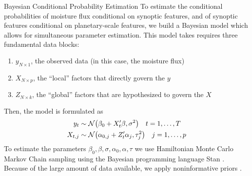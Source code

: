 \begin{block}{Bayesian Conditional Probability Estimation}
    To estimate the conditional probabilities of moisture flux conditional on synoptic features, and of synoptic features conditional on planetary-scale features, we build a Bayesian model which allows for simultaneous parameter estimation.
    This model takes requires three fundamental data blocks:
    \begin{enumerate}
        \item $y_{N \times 1}$, the observed data (in this case, the moisture flux)
        \item $X_{N \times p}$, the ``local'' factors that directly govern the $y$
        \item $Z_{N \times k}$, the ``global'' factors that are hypothesized to govern the $X$
    \end{enumerate}
    Then, the model is formulated as
    \begin{align}
        y_t & \sim \mathcal{N} \qty(\beta_0 + X'_t \beta, \sigma^2) \quad t = 1, \ldots, T \label{eq:yX}\\
        X_{t,j} &\sim \mathcal{N} \qty(\alpha_{0,j} + Z'_t \alpha_j, \tau_j^2) \quad j = 1, \ldots, p \label{eq:XZ}
    \end{align}
    To estimate the parameters $\beta_0, \beta, \sigma, \alpha_0, \alpha, \tau$ we use Hamiltonian Monte Carlo Markov Chain sampling using the Bayesian programming language Stan \cite{Carpenter2016}.
    Because of the large amount of data available, we apply noninformative priors \cite{Gelman2014}.

\end{block}
